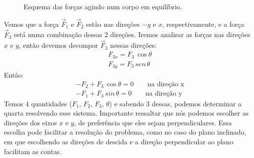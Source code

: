 \documentclass[12pt]{extarticle}
\newcommand{\<}{\langle}
\renewcommand{\>}{\rangle}
\theoremstyle{definition}
\begin{document}
\begin{figure}[H]
    \centering
    \caption{Esquema das forças agindo num corpo em equilíbrio.}
    \label{fig:eq_ponto_material}
\end{figure}

Vemos que a força $\vec{F}_1$ e $\vec{F}_2$ estão nas direções $-y$ e $x$, respectivamente, e a força $\vec{F}_3$ está numa combinação dessas 2 direções. Iremos analisar as forças nas direções $x$ e $y$, então devemos decompor $\vec{F}_3$ nessas direções:
\begin{equation}
    \begin{split}
        &F_{3x} = F_3\,\cos\theta\\
        &F_{3y} = F_3\,sen\, \theta
    \end{split}
\end{equation}
Então:
\begin{align*}
    &-F_2 + F_3\,\cos\theta =0\quad\quad\text{na direção x}\\
    &-F_1 + F_3\,sin\,\theta=0\quad\quad\text{na direção y}
\end{align*}
Temos 4 quantidades ($F_1,\,F_2,\,F_3,\,\theta$) e sabendo 3 dessas, podemos determinar a quarta resolvendo esse sistema.
Importante ressaltar que nós podemos escolher as direções dos eixos $x$ e $y$, de preferência que eles sejam perpendiculares. Essa escolha pode facilitar a resolução do problema, como no caso do plano inclinado, em que escolhendo as direções de descida e a direção perpendicular ao plano facilitam as contas. 
\end{document}
